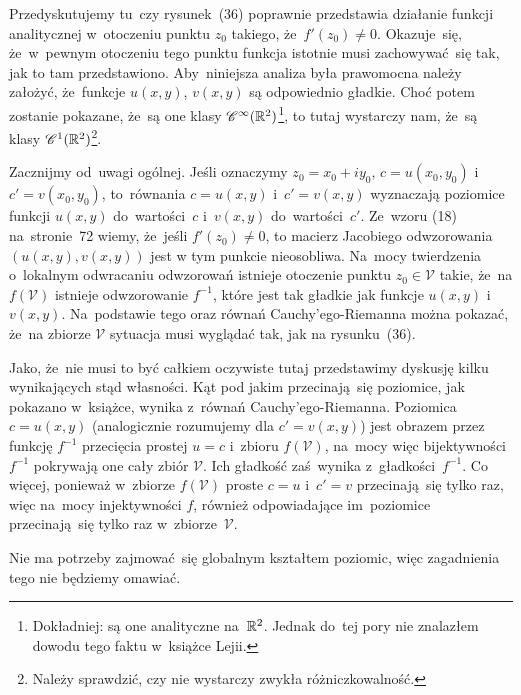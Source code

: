 \documentclass[a4paper,11pt]{article}
\begin{document}
\vspace{\spaceFour}


\start {} Przedyskutujemy tu~czy rysunek~(36) poprawnie
przedstawia działanie funkcji analitycznej w~otoczeniu punktu
$z_{ 0 }$ takiego, że~$f'( z_{ 0 } ) \neq 0$. Okazuje~się, że~w~pewnym
otoczeniu tego punktu funkcja istotnie musi zachowywać~się tak, jak to
tam przedstawiono. Aby~niniejsza analiza była prawomocna należy
założyć, że~funkcje $u( x, y )$, $v( x, y )$ są odpowiednio gładkie.
Choć potem zostanie pokazane, że~są one klasy
$\mathcal{C}^{ \infty }( \mathbb{R}^{ 2 } )$\footnote{Dokładniej: są one analityczne na~$\mathbb{R}^{ 2 }$.
  Jednak do~tej pory nie znalazłem dowodu tego faktu w~książce
  Lejii.}, to tutaj wystarczy nam, że~są klasy
$\mathcal{C}^{ 1 }( \mathbb{R}^{ 2 } )$\footnote{Należy sprawdzić, czy nie wystarczy zwykła
  różniczkowalność.}.

Zacznijmy od~uwagi ogólnej. Jeśli oznaczymy
$z_{ 0 } = x_{ 0 } + i y_{ 0 }$, $c = u( x_{ 0 }, y_{ 0 } )$
i~$c' = v( x_{ 0 }, y_{ 0 } )$, to~równania $c = u( x, y )$
i~$c' = v( x, y )$ wyznaczają poziomice funkcji $u( x, y )$
do~wartości~$c$ i~$v( x, y )$ do~wartości~$c'$. Ze~wzoru (18)
na~stronie~72 wiemy, że~jeśli $f'( z_{ 0 } ) \neq 0$, to macierz
Jacobiego odwzorowania $( u( x, y ), v( x, y ) )$ jest w tym punkcie
nieosobliwa. Na~mocy twierdzenia o~lokalnym odwracaniu odwzorowań
istnieje otoczenie punktu $z_{ 0 } \in \mathcal{V}$ takie, że~na
$f( \mathcal{V} )$ istnieje odwzorowanie $f^{ -1 }$, które jest tak
gładkie jak funkcje $u( x, y )$ i~$v( x, y )$. Na~podstawie tego oraz
równań Cauchy'ego-Riemanna można pokazać, że~na zbiorze $\mathcal{V}$
sytuacja musi wyglądać tak, jak na rysunku~(36).

Jako, że~nie musi to być całkiem oczywiste tutaj przedstawimy dyskusję
kilku wynikających stąd własności. Kąt pod jakim przecinają~się
poziomice, jak pokazano w~książce, wynika z~równań
Cauchy'ego-Riemanna. Poziomica $c = u( x, y )$ (analogicznie
rozumujemy dla $c' = v( x, y )$) jest obrazem przez funkcję $f^{ -1 }$
przecięcia prostej $u = c$ i~zbioru $f( \mathcal{V} )$, na~mocy więc
bijektywności~$f^{ -1 }$ pokrywają one cały zbiór $\mathcal{V}$. Ich
gładkość zaś~wynika z~gładkości~$f^{ -1 }$. Co więcej, ponieważ
w~zbiorze $f( \mathcal{V} )$ proste $c = u$ i~$c' = v$ przecinają~się
tylko raz, więc na~mocy injektywności $f$, również odpowiadające
im~poziomice przecinają~się tylko raz w~zbiorze~$\mathcal{V}$.

Nie ma potrzeby zajmować~się globalnym kształtem poziomic, więc
zagadnienia tego nie będziemy omawiać.
\end{document}
